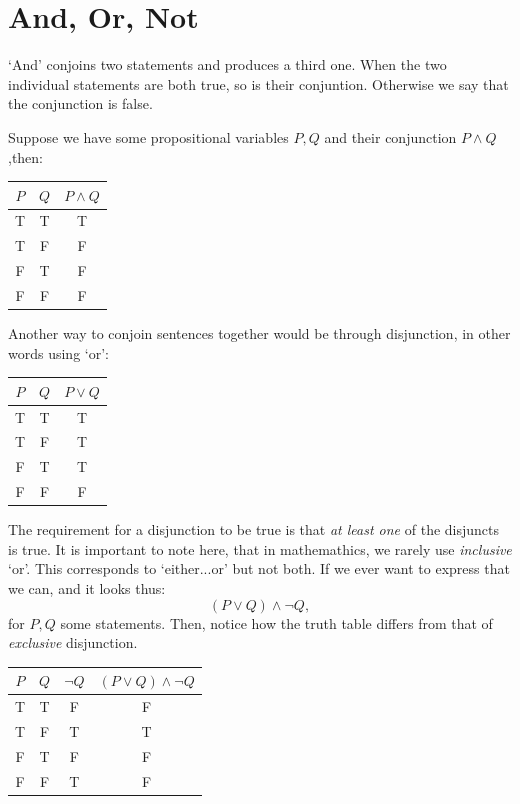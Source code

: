 \section{And, Or, Not}

`And' conjoins two statements and produces a third one. When the two individual statements are both true, so is their conjuntion. Otherwise we say that the conjunction is false. 

Suppose we have some propositional variables $P,Q$ and their conjunction $P\land Q$,then: 
\begin{table}[H]
    \centering
    \begin{tabular}{ccc}
        \toprule
        $P$ & $Q$ & $P\land Q$ \\
        \midrule
        T & T & T\\
        
        T & F & F\\
        
        F & T & F\\
        
        F & F & F\\
        \bottomrule
    \end{tabular}
\end{table}
Another way to conjoin sentences together would be through disjunction, in other words using `or': 
\begin{table}[H]
    \centering
    \begin{tabular}{ccc}
        \toprule
        $P$ & $Q$ & $P\lor Q$ \\
        \midrule
        T & T & T\\
        
        T & F & T\\
        
        F & T & T\\
        
        F & F & F\\
        \bottomrule
    \end{tabular}
\end{table}
The requirement for a disjunction to be true is that \emph{at least one} of the disjuncts is true. It is important to note here, that in mathemathics, we rarely use \emph{inclusive} `or'. This corresponds to `either...or' but not both. If we ever want to express that we can, and it looks thus: 
$$
(P\lor Q)\land \neg Q,
$$
for $P,Q$ some statements. Then, notice how the truth table differs from that of \emph{exclusive} disjunction.
\begin{table}[H]
    \centering
    \begin{tabular}{cccc}
        \toprule
        $P$ & $Q$ & $\neg Q$ & $(P\lor Q)\land\neg Q$\\
        \midrule
        T & T & F & F\\
        
        T & F & T & T\\
        
        F & T & F & F\\
        
        F & F & T & F\\
        \bottomrule
    \end{tabular}
\end{table}
